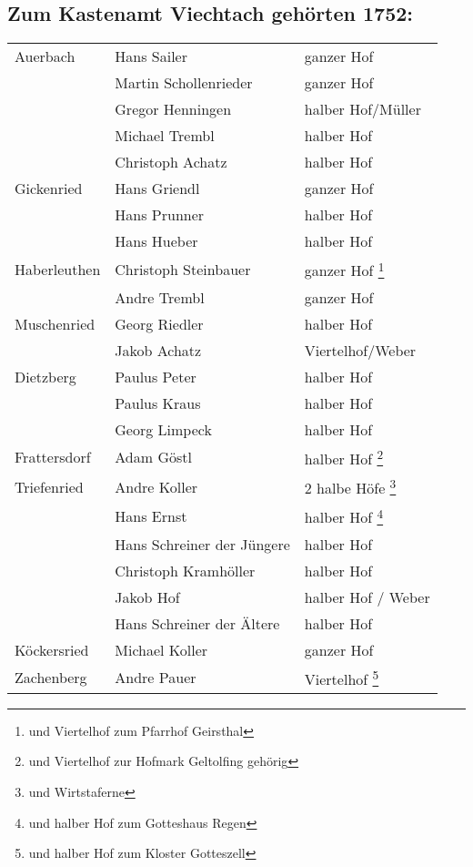 \documentclass{book}
\begin{document}
\subsection{Zum Kastenamt Viechtach gehörten 1752:}

\begin{longtable}{l|l|l}
Auerbach & Hans Sailer & ganzer Hof\\
& Martin Schollenrieder & ganzer Hof\\
& Gregor Henningen & halber Hof/Müller\\
& Michael Trembl & halber Hof\\
& Christoph Achatz & halber Hof\\
Gickenried & Hans Griendl & ganzer Hof\\
& Hans Prunner & halber Hof\\
& Hans Hueber & halber Hof\\

Haberleuthen & Christoph Steinbauer & ganzer Hof \footnote{und
Viertelhof zum Pfarrhof Geirsthal}\\

& Andre Trembl & ganzer Hof\\
Muschenried & Georg Riedler & halber Hof\\
& Jakob Achatz & Viertelhof/Weber\\
Dietzberg & Paulus Peter & halber Hof\\
& Paulus Kraus & halber Hof\\
& Georg Limpeck & halber Hof\\

Frattersdorf & Adam Göstl & halber Hof \footnote{und Viertelhof zur
Hofmark Geltolfing gehörig}\\

Triefenried & Andre Koller & 2 halbe Höfe \footnote{und Wirtstaferne}\\

& Hans Ernst & halber Hof \footnote{und halber Hof zum Gotteshaus
Regen}\\

& Hans Schreiner der Jüngere & halber Hof\\
& Christoph Kramhöller & halber Hof\\
& Jakob Hof & halber Hof / Weber\\
& Hans Schreiner der Ältere & halber Hof\\
Köckersried & Michael Koller & ganzer Hof\\

Zachenberg & Andre Pauer & Viertelhof \footnote{und halber Hof zum
Kloster Gotteszell}\\
\end{longtable}
\end{document}

